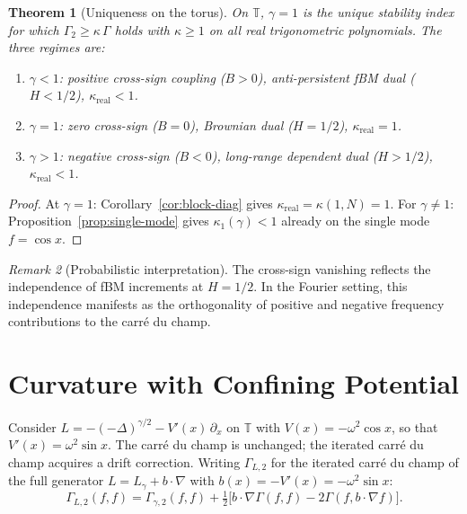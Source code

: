 \documentclass[11pt,a4paper]{article}
\theoremstyle{plain}
\newtheorem{theorem}{Theorem}[section]
\theoremstyle{definition}
\theoremstyle{remark}
\newtheorem{remark}[theorem]{Remark}
\newcommand{\T}{\mathbb{T}}
\begin{document}
\begin{theorem}[Uniqueness on the torus]\label{thm:uniqueness}
On $\T$, $\gamma = 1$ is the unique stability index for which
$\Gamma_2 \geq \kappa\,\Gamma$ holds with $\kappa \geq 1$
on all real trigonometric polynomials. The three regimes are:
\begin{enumerate}[label=(\roman*)]
\item $\gamma < 1$: positive cross-sign coupling ($B > 0$),
  anti-persistent fBM dual ($H < 1/2$), $\kappa_{\mathrm{real}} < 1$.
\item $\gamma = 1$: zero cross-sign ($B = 0$),
  Brownian dual ($H = 1/2$), $\kappa_{\mathrm{real}} = 1$.
\item $\gamma > 1$: negative cross-sign ($B < 0$),
  long-range dependent dual ($H > 1/2$), $\kappa_{\mathrm{real}} < 1$.
\end{enumerate}
\end{theorem}

\begin{proof}
At $\gamma = 1$: Corollary~\ref{cor:block-diag} gives
$\kappa_{\mathrm{real}} = \kappa(1,N) = 1$.
For $\gamma \neq 1$: Proposition~\ref{prop:single-mode} gives
$\kappa_1(\gamma) < 1$ already on the single mode $f = \cos x$.
\end{proof}

\begin{remark}[Probabilistic interpretation]
The cross-sign vanishing reflects the independence of fBM increments
at $H = 1/2$. In the Fourier setting, this independence manifests as
the orthogonality of positive and negative frequency contributions
to the carr\'e du champ.
\end{remark}


\section{Curvature with Confining Potential}\label{sec:potential}

Consider $L = -(-\Delta)^{\gamma/2} - V'(x)\,\partial_x$ on $\T$
with $V(x) = -\omega^2\cos x$, so that
$V'(x) = \omega^2\sin x$. The carr\'e du champ is unchanged;
the iterated carr\'e du champ acquires a drift correction.
Writing $\Gamma_{L,2}$ for the iterated carr\'e du champ of the
full generator $L = L_\gamma + b \cdot \nabla$ with
$b(x) = -V'(x) = -\omega^2\sin x$:
\begin{equation}\label{eq:G2-drift}
  \Gamma_{L,2}(f,f) = \Gamma_{\gamma,2}(f,f)
  + \tfrac{1}{2}\bigl[
    b \cdot \nabla\Gamma(f,f) - 2\Gamma(f, b \cdot \nabla f)
  \bigr].
\end{equation}
\end{document}
